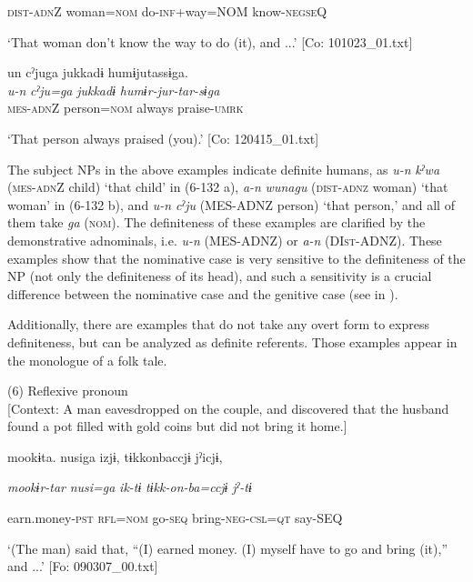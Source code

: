       \textsc{dist}-\textsc{adn}Z  woman=\textsc{nom}  do-\textsc{inf}+way=NOM  know-\textsc{negseQ}

\glt ‘That woman don’t know the way to do (it), and ...’ [Co: 101023\_01.txt]
\z

 \ex {\TM}  un  cˀjuga  jukkadɨ  humɨjutassɨga.\\
\gll \textit{u-n}  \textit{cˀju=ga}  \textit{jukkadɨ}  \textit{humɨr-jur-tar-sɨga}\\

      \textsc{mes}-\textsc{adn}Z  person=\textsc{nom}  always  praise-\textsc{umrk}

\glt ‘That person always praised (you).’ [Co: 120415\_01.txt]
\z

The subject NPs in the above examples indicate definite humans, as \textit{u-n} \textit{kˀwa} (\textsc{mes}-\textsc{adn}Z child) ‘that child’ in (6-132 a), \textit{a-n} \textit{wunagu} (\textsc{dist}-\textsc{adnz} woman) ‘that woman’ in (6-132 b), and \textit{u-n} \textit{cˀju} (MES-ADNZ person) ‘that person,’ and all of them take \textit{ga} (\textsc{nom}). The definiteness of these examples are clarified by the demonstrative adnominals, i.e. \textit{u-n} (MES-ADNZ) or \textit{a-n} (DI\textsc{st}-ADNZ). These examples show that the nominative case is very sensitive to the definiteness of the NP (not only the definiteness of its head), and such a sensitivity is a crucial difference between the nominative case and the genitive case (see  in ).

  Additionally, there are examples that do not take any overt form to express definiteness, but can be analyzed as definite referents. Those examples appear in the monologue of a folk tale.

(6) \ea Reflexive pronoun\\{}
[Context: A man eavesdropped on the couple, and discovered that the husband found a pot filled with gold coins but did not bring it home.]

{\TM}
\gll mookɨta.  nusiga  izjɨ,  tɨkkonbaccjɨ  jˀicjɨ,

      \textit{mookɨr-tar}  \textit{nusi=ga}  \textit{ik-tɨ}  \textit{tɨkk-on-ba=ccjɨ}  \textit{jˀ-tɨ}

      earn.money-\textsc{pst}  \textsc{rfl}=\textsc{nom}  go-\textsc{seq}  bring-\textsc{neg}-\textsc{csl}=\textsc{qt}  say-SEQ

\glt ‘(The man) said that, “(I) earned money. (I) myself have to go and bring (it),” and ...’ [Fo: 090307\_00.txt]
\z

